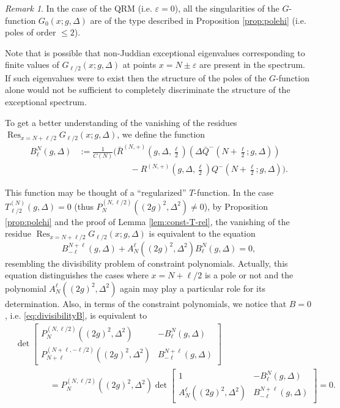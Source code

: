 \documentclass[11pt]{article}
\numberwithin{equation}{section}
\newcommand{\e}{\varepsilon}
\newcommand{\cp}[2]{P^{(#1)}_{#2}} %
\DeclareMathOperator*{\Res}{Res} %
\theoremstyle{plain}
\theoremstyle{definition}
\theoremstyle{remark}
\newtheorem{rem}{Remark}[section]
\begin{document}
\begin{rem}
  In the case of the QRM (i.e. \(\e=0 \)), all the singularities of the $G$-function \(G_{0}(x;g,\Delta) \) are of the type described in Proposition \ref{prop:polehi}
  (i.e. poles of order \(\leq 2\)).
\end{rem}

Note that is possible that non-Juddian exceptional eigenvalues corresponding to finite values of $G_{\ell/2}(x;g,\Delta)$ at points \(x = N \pm \e \)
are present in the spectrum. If such eigenvalues were to exist then the structure of the poles of the $G$-function alone would not be sufficient
to completely discriminate the structure of the exceptional spectrum.

To get a better understanding of the vanishing of the residues \(\Res_{x = N + \ell/2}  G_{\ell/2}(x;g,\Delta)\), we define the function
\begin{align*}
  B^N_{\ell}(g,\Delta) &:= \frac{1}{C(N)}\Big(\bar{R}^{(N,+)}(g,\Delta,\frac{\ell}{2}) (\Delta\bar{Q}^-(N+\frac{\ell}{2};g,\Delta)) \\
               & \qquad \qquad \qquad -   R^{(N,+)}(g,\Delta,\frac{\ell}{2})  Q^-(N+\frac{\ell}{2};g,\Delta)  \Big).
\end{align*}

This function may be thought of a ``regularized'' $T$-function. In the case \(T^{(N)}_{\ell/2}(g,\Delta)=0\) (thus
\(\cp{N,\ell/2}{N}((2g)^2,\Delta^2) \not= 0 \)), by Proposition \ref{prop:polehi} and the proof of Lemma \ref{lem:const-T-rel},
the vanishing of the residue \(\Res_{x = N + \ell/2}  G_{\ell/2}(x;g,\Delta)\) is equivalent to the equation
\begin{equation}\label{eq:divisibilityB}
  B^{N+\ell}_{-\ell}(g,\Delta) + A_N^{\ell}((2g)^2,\Delta^2) B^N_{\ell}(g,\Delta) = 0,
\end{equation}
resembling the divisibility problem of constraint polynomials. Actually, this equation distinguishes the cases where $x=N+\ell/2$
is a pole or not and the polynomial $A_N^{\ell}((2g)^2,\Delta^2)$ again may play a particular role for its determination.
Also, in terms of the constraint polynomials, we notice that $B=0$, i.e. \eqref{eq:divisibilityB}, is equivalent to
\begin{align*}
 & \det
  \begin{bmatrix}  P_{N}^{(N, \ell/2)}((2g)^2,\Delta^2) & -B_\ell^N(g,\Delta)  \\
  P_{N+\ell}^{(N+\ell, -\ell/2)}((2g)^2,\Delta^2) & B_{-\ell}^{N+\ell}(g,\Delta)
  \end{bmatrix}
  \\
  &\qquad \qquad= P_{N}^{(N, \ell/2)}((2g)^2,\Delta^2)
  \det \begin{bmatrix}
  1 & -B_\ell^N(g,\Delta)  \\
  A_N^\ell((2g)^2,\Delta^2) & B_{-\ell}^{N+\ell}(g,\Delta)
  \end{bmatrix}
  =0.
\end{align*}
\end{document}
